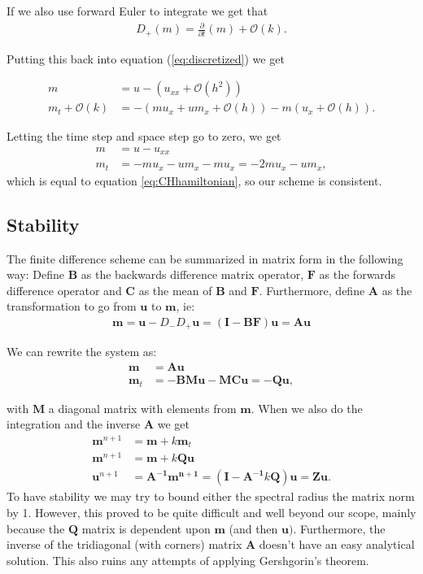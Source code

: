 If we also use forward Euler to integrate we get that
\begin{align*}
D_+ (m) =  \frac{\partial}{\partial t} (m) + \mathcal{O}(k).
\end{align*}

Putting this back into equation (\ref{eq:discretized}) we get

\begin{align*}
m &= u - \left( u_{xx} + \mathcal{O}\left(h^2\right) \right) \\
m_t  + \mathcal{O}(k) &= - \left( m u_x + u m_x + \mathcal{O}(h) \right) - m \left( u_x + \mathcal{O}(h) \right).
\end{align*}

Letting the time step and space step go to zero, we get
\begin{align*}
m &= u - u_{xx} \\
m_t &= - m u_x - u m_x - m u_x = - 2m u_x - u m_x,
\end{align*}
which is equal to equation \ref{eq:CHhamiltonian}, so our scheme is consistent. 

\subsection*{Stability}
The finite difference scheme can be summarized in matrix form in the following way:
Define $\bm{B}$ as the backwards difference matrix operator, $\bm{F}$ as the forwards difference operator and $\bm{C}$ as the mean of $\bm{B}$ and $\bm{F}$. Furthermore, define $\bm{A}$ as the transformation to go from $\bm{u}$ to $\bm{m}$, ie:
\begin{align*}
\bm{m} = \bm{u}-D_-D_+\bm{u} = (\bm{I}-\bm{BF})\bm{u} = \bm{A} \bm{u}
\end{align*} 


We can rewrite the system as:
\begin{align*}
\bm{m} &= \bm{Au} \\
\bm{m}_t &= -\bm{BMu} - \bm{MCu} = \bm{-Qu},
\end{align*}

with $\bm{M}$ a diagonal matrix with elements from $\bm{m}$. When we also do the integration and the inverse $\bm{A}$ we get
\begin{align*}
\bm{m}^{n+1} &= \bm{m} + k\bm{m}_t \\
\bm{m}^{n+1} &= \bm{m} + k\bm{Qu} \\
\bm{u}^{n+1} &= \bm{A^{-1}m^{n+1}} = \left(\bm{I} -\bm{A^{-1}}k\bm{Q}\right)\bm{u} = \bm{Zu}.
\end{align*}
To have stability we may try to bound either the spectral radius the matrix norm by 1. However, this proved to be quite difficult and well beyond our scope, mainly because the $\bm{Q}$ matrix is dependent upon $\bm{m}$ (and then $\bm{u})$. Furthermore, the inverse of the tridiagonal (with corners) matrix $\bm{A}$ doesn't have an easy analytical solution. This also ruins any attempts of applying Gershgorin's theorem.

